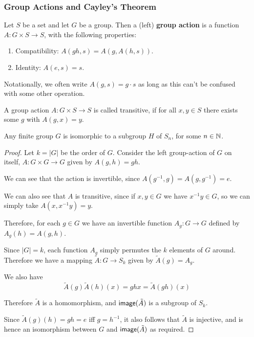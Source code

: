 \subsubsection{Group Actions and Cayley's Theorem}
\begin{defn}  Let $S$ be a set and let $G$ be a group. Then a (left) \textbf{group action} is a function $A : G\times S \to S$, with the following properties:
\begin{enumerate}
\item {
Compatibility: $A(gh,s) = A(g,A(h,s))$.
}
\item {
Identity: $A(e,s) = s$.
}
\end{enumerate}
Notationally, we often write $A(g,s) = g\cdot s$ as long as this can't be confused with some other operation.
\end{defn}
\begin{defn}
    A group action $A: G\times S \to S$ is called transitive, if for all $x,y \in S$ there exists some $g$ with $A(g,x) = y$.
\end{defn}
\begin{thm} Any finite group $G$ is isomorphic to a subgroup $H$ of $S_n$, for some $n \in \operatorname{\mathbb{N}}$.
\end{thm}
\begin{proof}
Let $k = |G|$ be the order of $G$. Consider the left group-action of $G$ on itself, $A : G \times G\to G$ given by $A(g,h) = gh$. 

We can see that the action is invertible, since $A(g^{-1},g) =A(g,g^{-1}) = e$. 

We can also see that $A$ is transitive, since if $x,y \in G$ we have $x^{-1}y\in G$, so we can simply take $A(x,x^{-1}y) = y$. 

Therefore, for each $g \in G$ we have an invertible function $A_g : G \to G$ defined by $A_g(h) = A(g,h)$.

Since $|G|=k$, each function $A_g$ simply permutes the $k$ elements of $G$ around. Therefore we have a mapping $\tilde{A} : G \to S_k$ given by $\tilde{A}(g) = A_g$. 

We also have \[\tilde{A}(g)\tilde{A}(h)(x) = ghx = \tilde{A}(gh)(x)\]

Therefore $\tilde{A}$ is a homomorphism, and $\operatorname{\textsf{image}}(\tilde{A})$ is a subgroup of $S_k$. 

Since $\tilde{A}(g)(h) = gh = e$ iff $g = h^{-1}$, it also follows that $\tilde{A}$ is injective, and is hence an isomorphism between $G$ and $\operatorname{\textsf{image}}(\tilde{A})$ as required.
\end{proof}

